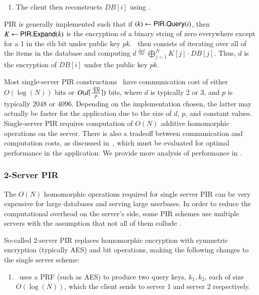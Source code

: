 {\begin{enumerate}
		\item The client then reconstructs $DB[i]$ using \pirextract.
		
	\end{enumerate}
	
	PIR is generally implemented such that if $(k) \gets \textsf{PIR.Query}(i)$, then $K \gets \textsf{PIR.Expand}(k)$ is the encryption of a binary string of zero everywhere except for a 1 in the $i$th bit under public key $pk$. \pirans\ then consists of iterating over all of the items in the database and computing $d \overset{\textrm{def}}= \textstyle  \bigoplus_{j=1}^N K[j] \cdot DB[j]$. Thus, $d$ is the encryption of $DB[i]$ under the public key $pk$.
	
	Most single-server PIR constructions~\cite{10.1007,10.1007/978-3-319-11203-9_22,SP:ACLS18,  EPRINT:ALPRSSY19} have communication cost of either $O(\log(N))$ bits or $O(d {\lceil{\frac{\sqrt[d]{N}}{p}}\rceil})$ bits, where $d$ is typically 2 or 3, and  $p$ is typically 2048 or 4096. Depending on the implementation chosen, the latter may actually be faster for the application due to the size of $d$, $p$, and constant values. Single-server PIR requires computation of $O(N)$ additive homomorphic operations on the server. There is also a tradeoff between communication and computation costs, as discussed in~\cite{EPRINT:ALPRSSY19}, which must be evaluated for optimal performance in the application.  We provide more analysis of performance in .
	
	
	\subsubsection{2-Server PIR}
	The $O(N)$ homomorphic operations required for single server PIR can be very expensive for large databases and serving large userbases. In order to reduce the computational overhead on the server's side, some PIR schemes use multiple servers with the assumption that not all of them collude \cite{EC:BoyGilIsh15,CCS:BoyGilIsh16}.
	
	So-called 2-server PIR replaces homomorphic encryption with symmetric encryption (typically AES) and bit operations, making the following changes to the single server scheme:
	
	\begin{enumerate}
		\item \pirqe\ uses a PRF (such as AES) to produce two query keys, $k_1, k_2$, each of size $O(\log(N))$, which the client sends to server 1 and server 2 respectively.
		

\end{enumerate}}

